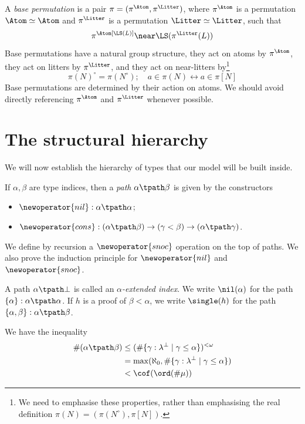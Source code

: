 \begin{definition}
  \label{def:BasePerm}
  \leanok
  A \emph{base permutation} is a pair \( \pi = (\pi^\Atom, \pi^\Litter) \), where \( \pi^\Atom \) is a permutation \( \Atom \simeq \Atom \) and \( \pi^\Litter \) is a permutation \( \Litter \simeq \Litter \), such that
  \[ \pi^\Atom[\LS(L)] \near \LS(\pi^\Litter(L)) \]
  Base permutations have a natural group structure, they act on atoms by \( \pi^\Atom \), they act on litters by \( \pi^\Litter \), and they act on near-litters by\footnote{We need to emphasise these properties, rather than emphasising the real definition \( \pi(N) = (\pi(N^\circ), \pi[N]) \).}
  \[ \pi(N)^\circ = \pi(N^\circ);\quad a \in \pi(N) \leftrightarrow a \in \pi[N] \]
  Base permutations are determined by their action on atoms.
  We should avoid directly referencing \( \pi^\Atom \) and \( \pi^\Litter \) whenever possible.
\end{definition}

\section{The structural hierarchy}

We will now establish the hierarchy of types that our model will be built inside.

\begin{definition}[path]
  \label{def:Path}
  \leanok
  If \( \alpha, \beta \) are type indices, then a \emph{path} \( \alpha \tpath \beta \) is given by the constructors
  \begin{itemize}
    \item \( \newoperator{nil} : \alpha \tpath \alpha \);
    \item \( \newoperator{cons} : (\alpha \tpath \beta) \to (\gamma < \beta) \to (\alpha \tpath \gamma) \).
  \end{itemize}
  We define by recursion a \( \newoperator{snoc} \) operation on the top of paths.
  We also prove the induction principle for \( \newoperator{nil} \) and \( \newoperator{snoc} \).

  A path \( \alpha \tpath \bot \) is called an \emph{\( \alpha \)-extended index}.
  We write \( \nil(\alpha) \) for the path \( \{ \alpha \} : \alpha \tpath \alpha \).
  If \( h \) is a proof of \( \beta < \alpha \), we write \( \single(h) \) for the path \( \{ \alpha, \beta \} : \alpha \tpath \beta \).

  We have the inequality
  \begin{align*}
    \#(\alpha \tpath \beta)
    &\leq (\#\{ \gamma : \lambda^\bot \mid \gamma \leq \alpha \})^{<\omega} \\
    &= \max(\aleph_0, \#\{ \gamma : \lambda^\bot \mid \gamma \leq \alpha \}) \\
    &< \cof(\ord(\#\mu))
  \end{align*}
\end{definition}

